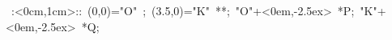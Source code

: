 \hbox{
\xy    <1cm,0cm>:<0cm,1cm>::
       (0,0)="O" ; (3.5,0)="K" **\dir{-};
       "O"+<0em,-2.5ex> *{P};
       "K"+<0em,-2.5ex> *{Q};
\endxy}
